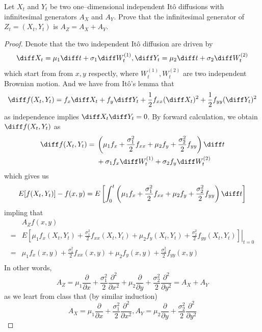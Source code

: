 \problem
\begin{question}
    Let $X_t$ and $Y_t$ be two one--dimensional independent It\^o diffusions with infinitesimal generators $A_X$ and $A_Y$.  Prove that the infinitesimal generator of $Z_t=(X_t,Y_t)$ is $A_Z=A_X+A_Y$.
\end{question}
\begin{proof}
    Denote that the two independent It\^o diffusion are driven by
    \[\diff X_t=\mu_1\diff t+\sigma_1\diff W_t^{(1)},
    \diff Y_t=\mu_2\diff t+\sigma_2\diff W_t^{(2)}\]
    which start from from $x,y$ respectly,
    where $W_t^{(1)},W_t^{(2)}$ are two independent Brownian motion.
    And we have from It\^o's lemma that
    \[\diff f(X_t,Y_t)=f_x\diff X_t+f_y\diff Y_t+\frac{1}{2}f_{xx}(\diff X_t)^2
    +\frac{1}{2}f_{yy}(\diff Y_t)^2\]
    as independence implies $\diff X_t\diff Y_t=0$. By forward calculation, we obtain
    $\diff f(X_t,Y_t)$ as
    \[\diff f(X_t,Y_t)=\begin{aligned}[t]
    &\left(\mu_1f_x+\frac{\sigma^2_1}{2}f_{xx}
    +\mu_2f_y+\frac{\sigma^2_2}{2}f_{yy}\right)\diff t\\
    &+\sigma_1f_x\diff W_t^{(1)}+\sigma_2f_y\diff W_t^{(2)}
    \end{aligned}\]
    which gives us
    \[E[f(X_t,Y_t)]-f(x,y)=E\left[\int_0^t
    \left(\mu_1f_x+\frac{\sigma_1^2}{2}f_{xx}
    +\mu_2f_y+\frac{\sigma_2^2}{2}f_{yy}\right)\diff t
    \right]\]
    impling that
    \[\begin{aligned}
        &A_Zf(x,y)\\
        =&E\left[\left.\mu_1f_x(X_t,Y_t)+\frac{\sigma_1^2}{2}f_{xx}(X_t,Y_t)
        +\mu_2f_y(X_t,Y_t)+\frac{\sigma_2^2}{2}f_{yy}(X_t,Y_t)\right]\right|_{t=0}\\
        =&\mu_1f_x(x,y)+\frac{\sigma_1^2}{2}f_{xx}(x,y)
        +\mu_2f_y(x,y)+\frac{\sigma_2^2}{2}f_{yy}(x,y)\\
    \end{aligned}\]
    In other words,
    \[A_Z=\mu_1\frac{\partial}{\partial x}
    +\frac{\sigma_1^2}{2}\frac{\partial^2}{\partial x^2}
    +\mu_2\frac{\partial}{\partial y}
    +\frac{\sigma_2^2}{2}\frac{\partial^2}{\partial y^2}
    =A_X+A_Y\]
    as we leart from class that (by similar induction)
    \[A_X=\mu_1\frac{\partial}{\partial x}
    +\frac{\sigma_1^2}{2}\frac{\partial^2}{\partial x^2},
    A_Y=\mu_2\frac{\partial}{\partial y}
    +\frac{\sigma_2^2}{2}\frac{\partial^2}{\partial y^2}\]


\end{proof}

